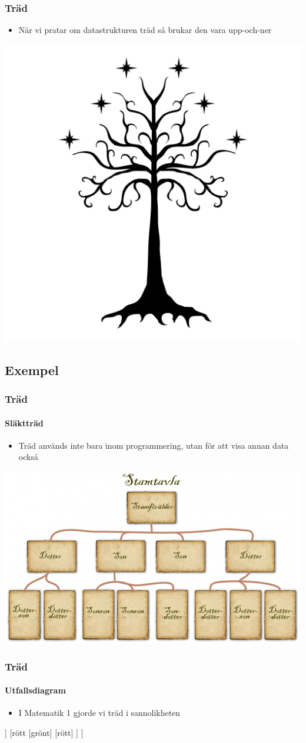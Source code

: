 \documentclass[aspectratio=169]{beamer}
\begin{document}
\begin{frame}
	\frametitle{Träd}
	\begin{itemize}
		\item När vi pratar om datastrukturen träd så brukar den vara upp-och-ner
	\end{itemize} 
	\centering
	\includegraphics[width=.45\linewidth,angle=180,origin=c]{tree-of-gondor.png}	
\end{frame}

\subsection{Exempel}

\begin{frame}
	\frametitle{Träd}
	\framesubtitle{Släktträd}
	
	
	\begin{itemize}
		\item Träd används inte bara inom programmering, utan för att visa annan data också
	\end{itemize}
	
	\centering
	\includegraphics[width=.65\linewidth]{Stamtavla.png}
	
\end{frame}

\begin{frame}
	\frametitle{Träd}
	\framesubtitle{Utfallsdiagram}
	
	\begin{itemize}
		\item I Matematik 1 gjorde vi träd i sannolikheten
	\end{itemize}
	
	\centering
	\begin{forest}
		[ljussignal
			[grönt
				[grönt]
				[rött]
			]
			[rött
				[grönt]
				[rött]
			]
		]
	\end{forest}
	
	
\end{frame}
\end{document}
